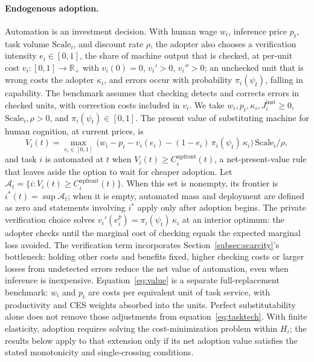 \documentclass[12pt]{article}
\theoremstyle{plain}
\theoremstyle{definition}
\theoremstyle{remark}
\begin{document}
\paragraph{Endogenous adoption.}
Automation is an investment decision. With human wage $w_i$, inference
price $p_t$, task volume $\mathrm{Scale}_i$, and discount rate $\rho$,
the adopter also chooses a verification intensity $e_i \in [0,1]$, the
share of machine output that is checked, at per-unit cost
$v_i:[0,1]\to\mathbb R_+$
with $v_i(0)=0$, $v_i' > 0$, $v_i'' > 0$; an unchecked unit that is wrong costs
the adopter $\kappa_i$, and errors occur with probability
$\pi_i(\psi_t)$, falling in capability. The benchmark assumes that
checking detects and corrects errors in checked units, with correction
costs included in $v_i$. We take
$w_i,p_t,\kappa_i,J_i^{\mathrm{inst}}\ge0$,
$\mathrm{Scale}_i,\rho>0$, and $\pi_i(\psi_t)\in[0,1]$. The present value of
substituting machine for human cognition, at current prices, is
\begin{equation}\label{eq:value}
V_i(t) = \max_{e_i \in [0,1]}\,
         \big(w_i - p_t - v_i(e_i)
         - (1-e_i)\,\pi_i(\psi_t)\,\kappa_i\big)\,
         \mathrm{Scale}_i/\rho,
\end{equation}
and task $i$ is automated at $t$ when
$V_i(t) \ge C_i^{\mathrm{upfront}}(t)$, a net-present-value rule that
leaves aside the option to wait for cheaper adoption. Let
$\mathcal A_t=\{i:V_i(t)\ge C_i^{\mathrm{upfront}}(t)\}$. When this set
is nonempty, its frontier is $i^{*}(t)=\sup\mathcal A_t$; when it is
empty, automated mass and deployment are defined as zero and statements
involving $i^*$ apply only after adoption begins.
The private verification choice solves
$v_i'(e_i^{p}) = \pi_i(\psi_t)\,\kappa_i$ at an interior optimum: the
adopter checks until the marginal cost of checking equals the expected
marginal loss avoided.
The verification term incorporates Section~\ref{subsec:scarcity}'s
bottleneck: holding other costs and benefits fixed, higher checking
costs or larger losses from undetected errors reduce the net value of
automation, even when inference is inexpensive. Equation~\eqref{eq:value} is a separate full-replacement benchmark:
$w_i$ and $p_t$ are costs per equivalent unit of task service, with
productivity and CES weights absorbed into the units. Perfect
substitutability alone does not remove those adjustments from
equation~\eqref{eq:tasktech}. With finite elasticity, adoption requires
solving the cost-minimization problem within $H_i$; the results below
apply to that extension only if its net adoption value satisfies the
stated monotonicity and single-crossing conditions.
\end{document}
